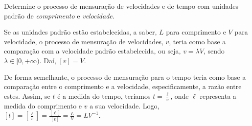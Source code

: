 \question
Determine o processo de mensuração de velocidades e de tempo com unidades padrão
de \textit{comprimento} e \textit{velocidade}.

\begin{solution}
Se as unidades padrão estão estabelecidas, a saber, $L$ para comprimento e 
$V$ para velocidade, o processo de mensuração de velocidades, $v$, teria como
base a comparação com a velocidade padrão estabelecida, ou seja, $v = \lambda V$,
sendo $\lambda \in [0, +\infty)$. 
Daí, $[v] = V$.

De forma semelhante, o processo de mensuração para o tempo teria como base a
comparação entre o comprimento e a velocidade, especificamente, a razão entre
estes.
Assim, se $t$ é a medida do tempo, teríamos $t = \frac{\ell}{v}$, onde $\ell$ 
representa a medida do comprimento e $v$ a sua velocidade.
Logo, 
$[t] = \left[\frac{\ell}{v}\right] = \frac{[\ell]}{[v]} = \frac{L}{V} = LV^{-1}$.
\end{solution}
